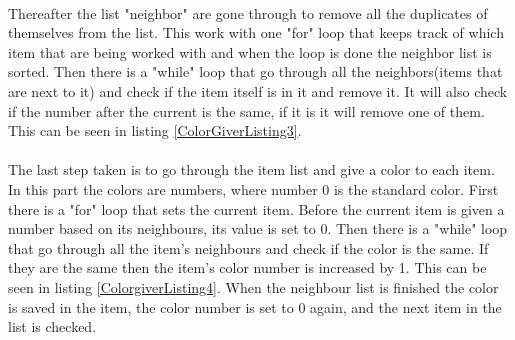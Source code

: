 \\
Thereafter the list "neighbor" are gone through to remove all the duplicates of themselves from the list. This work with one "for" loop that keeps track of which item that are being worked with and when the loop is done the neighbor list is sorted. Then there is a "while" loop that go through all the neighbors(items that are next to it) and check if the item itself is in it and remove it. It will also check if the number after the current is the same, if it is it will remove one of them. This can be seen in listing \ref{ColorGiverListing3}.\\
\\
The last step taken is to go through the item list and give a color to each item. In this part the colors are numbers, where number 0 is the standard color. First there is a "for" loop that sets the current item. Before the current item is given a number based on its neighbours, its value is set to 0. Then there is a "while" loop that go through all the item's neighbours and check if the color is the same. If they are the same then the item's color number is increased by 1. This can be seen in listing \ref{ColorgiverListing4}. When the neighbour list is finished the color is saved in the item, the color number is set to 0 again, and the next item in the list is checked.
